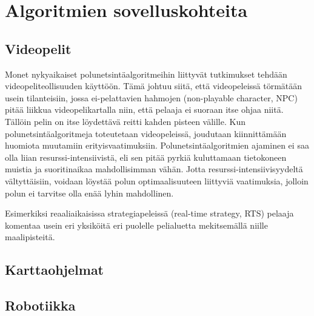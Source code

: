 \chapter{Algoritmien sovelluskohteita} \label{algoritmienSovelluskohteita}

\section{Videopelit}\label{videopelit}
Monet nykyaikaiset polunetsintäalgoritmeihin liittyvät tutkimukset tehdään 
videopeliteollisuuden 
käyttöön.\cite{MathewAndMalathy}\cite{ACMHindawi}\cite{mazeGameTrilogy} 
Tämä johtuu siitä, että videopeleissä törmätään usein tilanteisiin, jossa 
ei-pelattavien hahmojen (non-playable character, NPC) pitää liikkua 
videopelikartalla niin, että pelaaja ei suoraan itse ohjaa niitä. Tällöin 
pelin on itse löydettävä reitti kahden pisteen välille. Kun 
polunetsintäalgoritmeja toteutetaan videopeleissä, joudutaan kiinnittämään 
huomiota muutamiin erityisvaatimuksiin. Polunetsintäalgoritmien ajaminen 
ei saa olla liian resurssi-intensiivistä, eli sen pitää pyrkiä kuluttamaan 
tietokoneen muistia ja suoritinaikaa mahdollisimman vähän. Jotta 
resurssi-intensiivisyydeltä vältyttäisiin, voidaan löystää polun 
optimaalisuuteen liittyviä vaatimuksia, jolloin polun ei tarvitse olla enää 
lyhin mahdollinen.\cite{MathewAndMalathy} \par
	Esimerkiksi reaaliaikaisissa strategiapeleissä (real-time strategy, 
RTS) pelaaja komentaa usein eri yksiköitä eri puolelle pelialuetta 
mekitsemällä niille maalipisteitä. 

\section{Karttaohjelmat}\label{karttaohjelmat}
\section{Robotiikka}\label{robotiikka}
